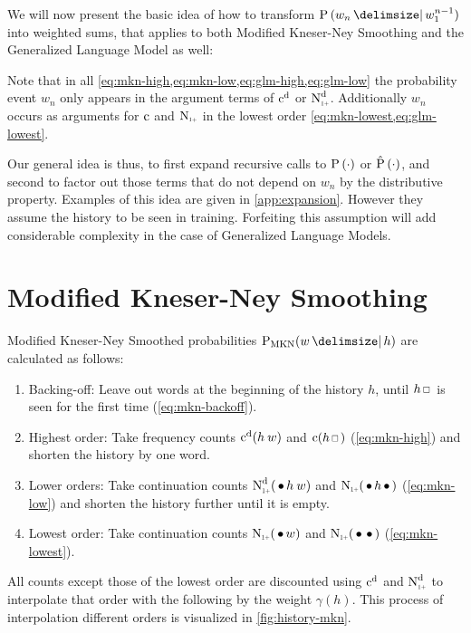We will now present the basic idea of how to transform $\Prob{w_n}{w_1^{n-1}}$
into weighted sums, that applies to both Modified Kneser-Ney Smoothing and
the Generalized Language Model as well:

Note that in all \cref{eq:mkn-high,eq:mkn-low,eq:glm-high,eq:glm-low} the
probability event $w_n$ only appears in the argument terms of
$\DiscountedCount$ or $\DiscountedCount*$.
Additionally $w_n$ occurs as arguments for $\operatorname{c}$ and $\ContCountIp$ in the
lowest order \cref{eq:mkn-lowest,eq:glm-lowest}.

Our general idea is thus, to first expand recursive calls to
$\Prob(\DummyArg)$ or $\Prob*(\DummyArg)$, and second to factor
out those terms that do not depend on $w_n$ by the distributive property.
Examples of this idea are given in \cref{app:expansion}.
However they assume the history to be seen in training.
Forfeiting this assumption will add considerable complexity in the case
of Generalized Language Models.

\clearpage %
\section{Modified Kneser-Ney Smoothing}

Modified Kneser-Ney Smoothed probabilities $\ProbMKN{w}{h}$ are calculated as
follows:
\begin{enumerate}
  \item Backing-off: Leave out words at the beginning of the history $h$, until
    $h \Skp$ is seen for the first time (\cref{eq:mkn-backoff}).
  \item Highest order: Take frequency counts $\DiscountedCount(h \: w)$ and
    $\Count(h \Skp)$ (\cref{eq:mkn-high}) and shorten the history by one word.
  \item Lower orders: Take continuation counts $\DiscountedCount*(\WSkp h \: w)$
    and $\ContCountIp(\WSkp h \WSkp)$ (\cref{eq:mkn-low}) and shorten the
    history further until it is empty.
  \item Lowest order: Take continuation counts $\ContCountIp(\WSkp w)$ and
    $\ContCountIp(\WSkp \WSkp)$ (\cref{eq:mkn-lowest}).
\end{enumerate}
All counts except those of the lowest order are discounted using
$\DiscountedCount$ and $\DiscountedCount*$ to interpolate that order with the
following by the weight $\gamma(h)$.
This process of interpolation different orders is visualized in
\cref{fig:history-mkn}.

